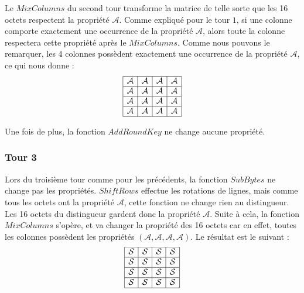 \indent Le $MixColumns$ du second tour transforme la matrice de telle sorte que les 16 octets respectent la propriété $\mathcal{A}$. Comme expliqué pour le tour $1$, si une colonne comporte exactement une occurrence de la propriété $\mathcal{A}$, alors toute la colonne respectera cette propriété après le $MixColumns$. Comme nous pouvons le remarquer, les 4 colonnes possèdent exactement une occurrence de la propriété $\mathcal{A}$, ce qui nous donne :  \\
$$
\begin{array}{|c|c|c|c|}
    \hline
    \mathcal{A} & \mathcal{A} & \mathcal{A} & \mathcal{A} \\
    \hline
    \mathcal{A} & \mathcal{A} & \mathcal{A} & \mathcal{A} \\
    \hline
    \mathcal{A} & \mathcal{A} & \mathcal{A} & \mathcal{A} \\
    \hline
    \mathcal{A} & \mathcal{A} & \mathcal{A} & \mathcal{A} \\
    \hline
\end{array}
$$

\indent Une fois de plus, la fonction $AddRoundKey$ ne change aucune propriété.


\subsubsection{Tour 3}

\indent Lors du troisième tour comme pour les précédents, la fonction $SubBytes$ ne change pas les propriétés. $ShiftRows$ effectue les rotations de lignes, mais comme tous les octets ont la propriété $\mathcal{A}$, cette fonction ne change rien au distingueur. Les 16 octets du distingueur gardent donc la propriété $\mathcal{A}$. Suite à cela, la fonction $MixColumns$ s'opère, et va changer la propriété des 16 octets car en effet, toutes les colonnes possèdent les propriétés $(\mathcal{A}, \mathcal{A}, \mathcal{A}, \mathcal{A})$. Le résultat est le suivant : 
$$
\begin{array}{|c|c|c|c|}
    \hline
    \mathcal{S} & \mathcal{S} & \mathcal{S} & \mathcal{S} \\
    \hline
    \mathcal{S} & \mathcal{S} & \mathcal{S} & \mathcal{S} \\
    \hline
    \mathcal{S} & \mathcal{S} & \mathcal{S} & \mathcal{S} \\
    \hline
    \mathcal{S} & \mathcal{S} & \mathcal{S} & \mathcal{S} \\
    \hline
\end{array}
$$

